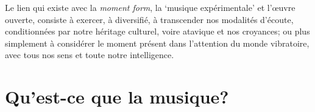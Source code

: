 \documentclass{article}
\begin{document}
Le lien qui existe avec la \textit{moment form}, la `musique expérimentale' et l'œuvre ouverte, consiste à exercer, à diversifié, à transcender nos modalités d'écoute, conditionnées par notre héritage culturel, voire atavique et nos croyances; ou plus simplement à considérer le moment présent dans l'attention du monde vibratoire, avec tous nos sens et toute notre intelligence.






%
%

%    
  

\section{Qu’est-ce que la musique?}
\end{document}
